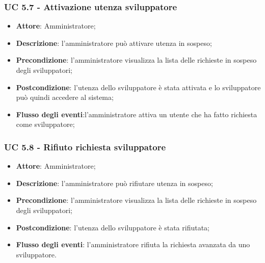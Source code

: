 \subsubsection{UC 5.7 - Attivazione utenza sviluppatore}
\begin{itemize}
\item \textbf{Attore}: Amministratore;
\item \textbf{Descrizione}: l'amministratore può attivare utenza in sospeso;
\item \textbf{Precondizione}: l'amministratore visualizza la lista delle richieste in sospeso degli sviluppatori;
\item \textbf{Postcondizione}: l'utenza dello sviluppatore è stata attivata e lo sviluppatore può quindi accedere al sistema;
\item \textbf{Flusso degli eventi}:l'amministratore attiva un utente che ha fatto richiesta come sviluppatore;
\end{itemize}

\subsubsection{UC 5.8 - Rifiuto richiesta sviluppatore}
\begin{itemize}
\item \textbf{Attore}: Amministratore;
\item \textbf{Descrizione}: l'amministratore può rifiutare utenza in sospeso;
\item \textbf{Precondizione}: l'amministratore visualizza la lista delle richieste in sospeso degli sviluppatori;
\item \textbf{Postcondizione}: l'utenza dello sviluppatore è stata rifiutata;
\item \textbf{Flusso degli eventi}: l'amministratore rifiuta la richiesta avanzata da uno sviluppatore.
\end{itemize}


